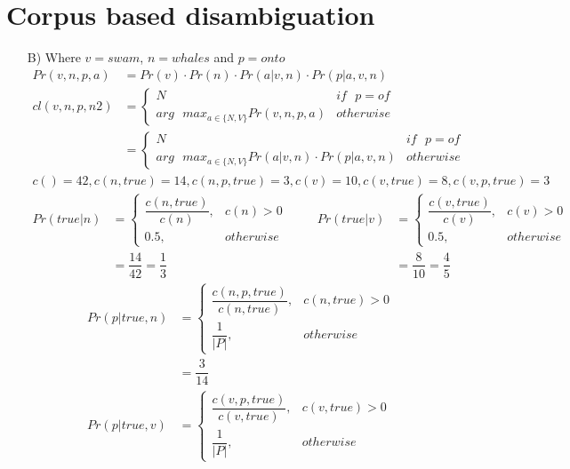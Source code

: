 \documentclass{article}
\begin{document}
\section{Corpus based disambiguation}
\begin{enumerate}
\item[B)]
Where $v=swam$, $n=whales$ and $p=onto$
\begin{align*}
Pr(v,n,p,a)&=Pr(v) \cdot Pr(n) \cdot Pr(a|v,n) \cdot Pr(p|a,v,n)\\
cl(v,n,p,n2)&= \left \{ \begin{array}{ll} N & if\text{ } p=of \\ arg \text{ } max_{a \in \{N,V\}} Pr(v,n,p,a) & otherwise \end{array} \right.\\
&= \left \{ \begin{array}{ll} N & if \text{ } p=of \\ arg \text{ } max_{a \in \{N,V\}} Pr(a|v,n) \cdot Pr(p|a,v,n) & otherwise \end{array} \right.
\end{align*}
\begin{align*}
c()=42, c(n,true)=14, c(n,p,true)=3, c(v)=10, c(v,true)=8, c(v,p,true)=3
\end{align*}
\begin{align*}
Pr(true|n) &= \left \{ \begin{array}{ll} \dfrac{c(n,true)}{c(n)}, & c(n)>0 \\ 0.5, & otherwise \end{array} \right. & & & Pr(true|v) &= \left \{ \begin{array}{ll} \dfrac{c(v,true)}{c(v)}, & c(v)>0 \\ 0.5, & otherwise \end{array} \right. \\
&= \dfrac{14}{42} = \dfrac{1}{3} & & & &= \dfrac{8}{10} = \dfrac{4}{5}
\end{align*}
\begin{align*}Pr(p|true,n) &= \left \{ \begin{array}{ll} \dfrac{c(n,p,true)}{c(n,true)}, & c(n,true)>0 \\ \dfrac{1}{|P|}, & otherwise \end{array} \right.\\
&= \dfrac{3}{14} \\
Pr(p|true,v) &= \left \{ \begin{array}{ll} \dfrac{c(v,p,true)}{c(v,true)}, & c(v,true)>0 \\ \dfrac{1}{|P|}, & otherwise \end{array} \right. \\

\end{align*}
\end{enumerate}
\end{document}
